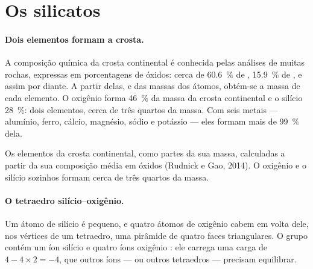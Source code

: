 \section{Os silicatos}

\paragraph{Dois elementos formam a crosta.} A composição química da crosta
continental é conhecida pelas análises de muitas rochas, expressas em
porcentagens de óxidos: cerca de \qty{60.6}{\percent} de ,
\qty{15.9}{\percent} de , e assim por diante. A partir delas, e das
massas dos átomos, obtém-se a massa de cada elemento. O oxigênio forma
\qty{46}{\percent} da massa da crosta continental e o silício
\qty{28}{\percent}: dois elementos, cerca de três quartos da massa. Com seis
metais --- alumínio, ferro, cálcio, magnésio, sódio e potássio --- eles
formam mais de \qty{99}{\percent} dela.

\begin{omfigure}

{\small Os elementos da crosta continental, como partes da sua massa,
calculadas a partir da sua composição média em óxidos (Rudnick e Gao,
2014). O oxigênio e o silício sozinhos formam cerca de três quartos da
massa.}
\end{omfigure}

\paragraph{O tetraedro silício--oxigênio.} Um átomo de silício é pequeno, e
quatro átomos de oxigênio cabem em volta dele, nos vértices de um tetraedro,
uma pirâmide de quatro faces triangulares. O grupo contém um íon silício
 e quatro íons oxigênio : ele carrega uma carga de
$4 - 4 \times 2 = -4$, que outros íons --- ou outros tetraedros --- precisam
equilibrar.

